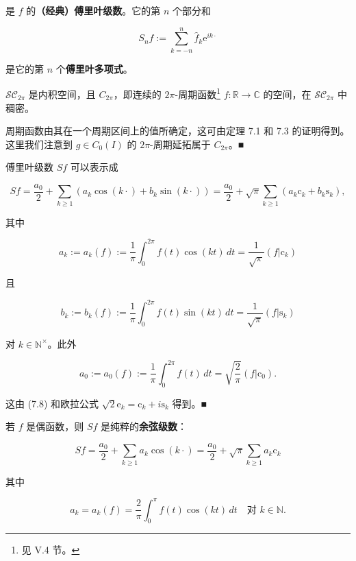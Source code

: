 是 $ f $ 的\textbf{（经典）傅里叶级数}。它的第 $ n $ 个部分和

\[
S_{n}f := \sum_{k=-n}^{n} \hat{f}_{k}\mathrm{e}^{ik\cdot}
\]

是它的第 $ n $ 个\textbf{傅里叶多项式}。

\begin{remark}

\begin{items}
\item

$ \mathcal{SC}_{2\pi} $ 是内积空间，且 $ C_{2\pi} $，即连续的 $ 2\pi $-周期函数\footnote{见 V.4 节。} $ f : \mathbb{R} \to \mathbb{C} $ 的空间，在 $ \mathcal{SC}_{2\pi} $ 中稠密。

\proofhead
周期函数由其在一个周期区间上的值所确定，这可由定理 7.1 和 7.3 的证明得到。这里我们注意到 $ g \in C_{0}(I) $ 的 $ 2\pi $-周期延拓属于 $ C_{2\pi} $。\nobreak\hspace{0.35em}■
\item

傅里叶级数 $ Sf $ 可以表示成

\[
Sf = \frac{a_{0}}{2} + \sum_{k \ge 1}(a_{k}\cos(k\cdot) + b_{k}\sin(k\cdot)) = \frac{a_{0}}{2} + \sqrt{\pi}\sum_{k \ge 1}(a_{k}\mathrm{c}_{k} + b_{k}\mathrm{s}_{k}) ,
\]

其中

\[
a_{k} := a_{k}(f) := \frac{1}{\pi}\int_{0}^{2\pi} f(t)\cos(kt) \, dt = \frac{1}{\sqrt{\pi}}(f|\mathrm{c}_{k})
\]

且

\[
b_{k} := b_{k}(f) := \frac{1}{\pi}\int_{0}^{2\pi} f(t)\sin(kt) \, dt = \frac{1}{\sqrt{\pi}}(f|\mathrm{s}_{k})
\]

对 $ k \in \mathbb{N}^{\times} $。此外

\[
a_{0} := a_{0}(f) := \frac{1}{\pi}\int_{0}^{2\pi} f(t) \, dt = \sqrt{\frac{2}{\pi}}(f|\mathrm{c}_{0}) .
\]

\proofhead
这由 (7.8) 和欧拉公式 $ \sqrt{2}\mathrm{e}_{k} = \mathrm{c}_{k} + i\mathrm{s}_{k} $ 得到。\nobreak\hspace{0.35em}■
\item

若 $ f $ 是偶函数，则 $ Sf $ 是纯粹的\textbf{余弦级数}：

\[
Sf = \frac{a_{0}}{2} + \sum_{k \ge 1} a_{k}\cos(k\cdot) = \frac{a_{0}}{2} + \sqrt{\pi}\sum_{k \ge 1} a_{k}\mathrm{c}_{k}
\]

其中

\[
a_{k} = a_{k}(f) = \frac{2}{\pi}\int_{0}^{\pi} f(t)\cos(kt) \, dt \quad \text{对 } k \in \mathbb{N} .
\]


\end{items}
\end{remark}
